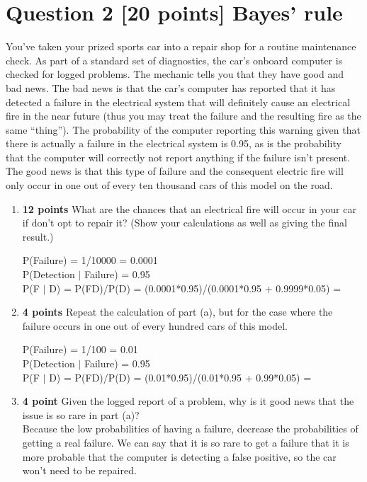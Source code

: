 \documentclass{article}
\def\ans#1{{\color{ans}#1}}
\begin{document}
\section{Question 2 [20 points] Bayes' rule}
You’ve taken your prized sports car into a repair shop for a routine maintenance check. As part of a standard set of diagnostics, the car’s onboard computer is checked for logged problems. The mechanic tells you that they have good and bad news. The bad news is that the car’s computer has reported that it has detected a failure in the electrical system that will definitely cause an electrical fire in the near future (thus you may treat the failure and the resulting fire as the same “thing”). The probability of the computer reporting this warning given that there is actually a failure in the electrical system is 0.95, as is the probability that the computer will correctly not report anything if the failure isn’t present. The good news is that this type of failure and the consequent electric fire will only occur in one out of every ten thousand cars of this model on the road. \\
\begin{enumerate}[label=(\alph*)]
    \item \textbf{12 points} What are the chances that an electrical fire will occur in your car if don’t opt to repair it? (Show your calculations as well as giving the final result.)\\
    \ans{
        \begin{center}
            P(Failure) = 1/10000 = 0.0001 \\
            P(Detection $|$ Failure) = 0.95 \\
            P(F $|$ D) = P(FD)/P(D) = (0.0001*0.95)/(0.0001*0.95 + 0.9999*0.05) = \fbox{0.001896} \\
        \end{center}
    }
    \item \textbf{4 points} Repeat the calculation of part (a), but for the case where the failure occurs in one out of every hundred cars of this model.    \\
    \ans{
        \begin{center}
            P(Failure) = 1/100 = 0.01 \\
            P(Detection $|$ Failure) = 0.95 \\
            P(F $|$ D) = P(FD)/P(D) = (0.01*0.95)/(0.01*0.95 + 0.99*0.05) = \fbox{0.1610} \\
        \end{center}
    }
    \item \textbf{4 point} Given the logged report of a problem, why is it good news that the issue is so rare in part (a)?\\
    \ans{
        Because the low probabilities of having a failure, decrease the probabilities 
        of getting a real failure. We can say that it is so rare to get a failure that 
        it is more probable that the computer is detecting a false positive, so the car 
        won't need to be repaired.
    }
\end{enumerate}
\end{document}
